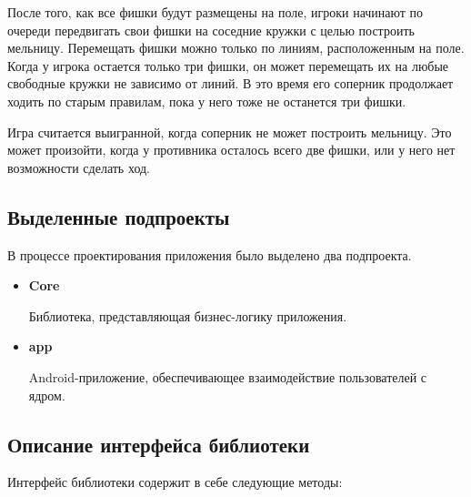 \documentclass[a4paper]{article}
\begin{document}
После того, как все фишки будут размещены на поле, игроки начинают по очереди передвигать свои фишки на соседние кружки с целью построить мельницу. Перемещать фишки можно только по линиям, расположенным на поле. Когда у игрока остается только три фишки, он может перемещать их на любые свободные кружки не зависимо от линий. В это время его соперник продолжает ходить по старым правилам, пока у него тоже не останется три фишки.

Игра считается выигранной, когда соперник не может построить мельницу. Это может произойти, когда у противника осталось всего две фишки, или у него нет возможности сделать ход.

\subsection{Выделенные подпроекты}

В процессе проектирования приложения было выделено два подпроекта.

\begin{itemize}

\item \textbf{Core}

Библиотека, представляющая бизнес-логику приложения.

\item \textbf{app}

Android-приложение, обеспечивающее взаимодействие пользователей с ядром.

\end{itemize}

\subsection{Описание интерфейса библиотеки}

Интерфейс библиотеки содержит в себе следующие методы:
\end{document}

